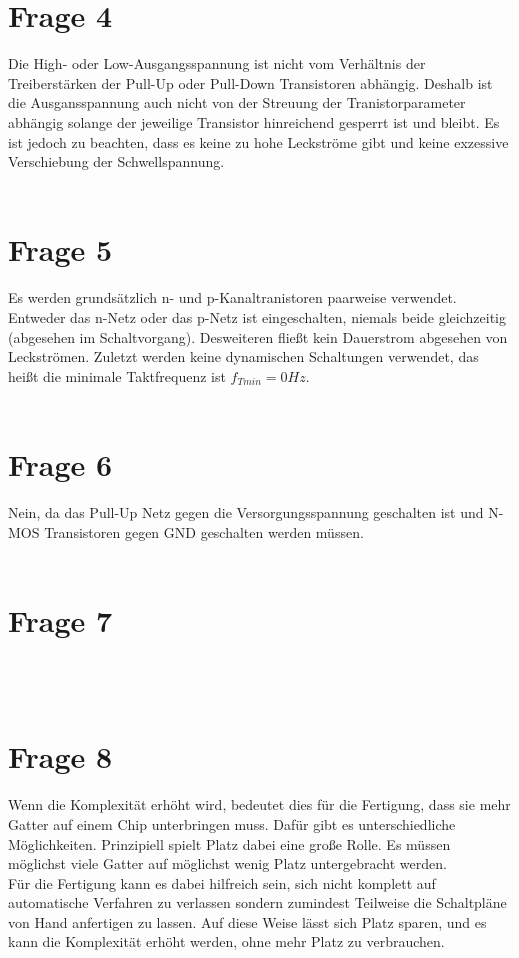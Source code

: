 \documentclass[a4paper]{scrartcl}
\begin{document}
\section*{Frage 4}
Die High- oder Low-Ausgangsspannung ist nicht vom Verhältnis der Treiberstärken der Pull-Up oder Pull-Down Transistoren abhängig. Deshalb ist die Ausgansspannung auch nicht von der Streuung der Tranistorparameter abhängig solange der jeweilige Transistor hinreichend gesperrt ist und bleibt. Es ist jedoch zu beachten, dass es keine zu hohe Leckströme gibt und keine exzessive Verschiebung der Schwellspannung.
~\\
~\\
\section*{Frage 5}
Es werden grundsätzlich n- und p-Kanaltranistoren paarweise verwendet. Entweder das n-Netz oder das p-Netz ist eingeschalten, niemals beide gleichzeitig (abgesehen im Schaltvorgang). Desweiteren fließt kein Dauerstrom abgesehen von Leckströmen. Zuletzt werden keine dynamischen Schaltungen verwendet, das heißt die minimale Taktfrequenz ist $f_{Tmin} = 0 Hz$.
~\\
~\\
\section*{Frage 6}
Nein, da das Pull-Up Netz gegen die Versorgungsspannung geschalten ist und N-MOS Transistoren gegen GND geschalten werden müssen.
~\\
~\\
\section*{Frage 7}

~\\
~\\
\section*{Frage 8}
Wenn die Komplexität erhöht wird, bedeutet dies für die Fertigung, dass sie mehr Gatter auf einem Chip unterbringen muss. Dafür gibt es unterschiedliche Möglichkeiten. Prinzipiell spielt Platz dabei eine große Rolle. Es müssen möglichst viele Gatter auf möglichst wenig Platz untergebracht werden.\\
Für die Fertigung kann es dabei hilfreich sein, sich nicht komplett auf automatische Verfahren zu verlassen sondern zumindest Teilweise die Schaltpläne von Hand anfertigen zu lassen. Auf diese Weise lässt sich Platz sparen, und es kann die Komplexität erhöht werden, ohne mehr Platz zu verbrauchen.
~\\
~\\
\end{document}
